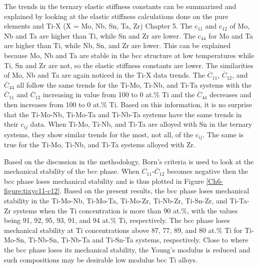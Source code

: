 The trends in the ternary elastic stiffness constants can be summarized and explained by looking at the elastic stiffness calculations done on the pure elements and Ti-X (X = Mo, Nb, Sn, Ta, Zr) Chapter 5. The c$_{11}$ and c$_{12}$ of Mo, Nb and Ta are higher than Ti, while Sn and Zr are lower. The c$_{44}$ for Mo and Ta are higher than Ti, while Nb, Sn, and Zr are lower. This can be explained because Mo, Nb and Ta are stable in the bcc structure at low temperatures while Ti, Sn and Zr are not, so the elastic stiffness constants are lower. The similarities of Mo, Nb and Ta are again noticed in the Ti-X data trends. The $\overline{C}_{11}$, $\overline{C}_{12}$, and $\overline{C}_{44}$ all follow the same trends for the Ti-Mo, Ti-Nb, and Ti-Ta systems with the $\overline{C}_{11}$ and $\overline{C}_{12}$ increasing in value from 100 to 0 at.\% Ti and the $\overline{C}_{44}$ decreases and then increases from 100 to 0 at.\% Ti. Based on this information, it is no surprise that the Ti-Mo-Nb, Ti-Mo-Ta and Ti-Nb-Ta systems have the same trends in their c$_{ij}$ data. When Ti-Mo, Ti-Nb, and Ti-Ta are alloyed with Sn in the ternary systems, they show similar trends for the most, not all, of the c$_{ij}$. The same is true for the Ti-Mo, Ti-Nb, and Ti-Ta systems alloyed with Zr.

Based on the discussion in the methodology, Born's criteria is used to look at the mechanical stability of the bcc phase. When $\overline{C}_{11}$-$\overline{C}_{12}$ becomes negative then the bcc phase loses mechanical stability and is thus plotted in Figure \ref{Ch6-figure:tixyc11-c12}. Based on the present results, the bcc phase loses mechanical stability in the Ti-Mo-Nb, Ti-Mo-Ta, Ti-Mo-Zr, Ti-Nb-Zr, Ti-Sn-Zr, and Ti-Ta-Zr systems when the Ti concentration is more than 90 at.\%, with the values being 91, 92, 95, 93, 91, and 94 at.\% Ti, respectively. The bcc phase loses mechanical stability at Ti concentrations above 87, 77, 89, and 80 at.\% Ti for Ti-Mo-Sn, Ti-Nb-Sn, Ti-Nb-Ta and Ti-Sn-Ta systems, respectively. Close to where the bcc phase loses its mechanical stability, the Young's modulus is reduced and such compositions may be desirable low modulus bcc Ti alloys.

